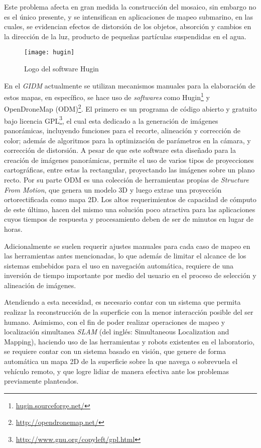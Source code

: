 Este problema afecta en gran medida la construcción del mosaico, sin embargo no es el único presente, y se intensifican en aplicaciones de mapeo submarino, en las cuales, se evidencian efectos de distorsión de los objetos, absorción y cambios en la dirección de la luz, producto de pequeñas partículas suspendidas en el agua.

\begin{wrapfigure}{r}{0.3\textwidth}
	\begin{center}
		\vspace*{-0.5in}
		\texttt{[image: hugin]}
	\end{center}
	\caption{Logo del software Hugin}
\end{wrapfigure}

En el \textit{GIDM} actualmente se utilizan mecanismos manuales para la elaboración de estos mapas, en específico, se hace uso de \textit{softwares} como Hugin\footnote{\url{hugin.sourceforge.net/}} y OpenDroneMap (ODM)\footnote{\url{http://opendronemap.net/}}. El primero es un programa de código abierto y gratuito bajo licencia GPL\footnote{\url{http://www.gnu.org/copyleft/gpl.html}}, el cual esta dedicado a la generación de imágenes panorámicas, incluyendo funciones para el recorte, alineación y corrección de color; además de algoritmos para la optimización de parámetros en la cámara, y corrección de distorsión. A pesar de que este software esta diseñado para la creación de imágenes panorámicas, permite el uso de varios tipos de proyecciones cartográficas, entre estas la rectangular, proyectando las imágenes sobre un plano recto. Por su parte ODM es una colección de herramientas propias de \textit{Structure From Motion}, que genera un modelo 3D y luego extrae una proyección ortorectificada como mapa 2D. Los altos requerimientos de capacidad de cómputo de este último, hacen del mismo una solución poco atractiva para las aplicaciones cuyos tiempos de respuesta y procesamiento deben de ser de minutos en lugar de horas.

Adicionalmente se suelen requerir ajustes manuales para cada caso de mapeo en las herramientas antes mencionadas, lo que además de limitar el alcance de los sistemas embebidos para el uso en navegación automática, requiere de una inversión de tiempo importante por medio del usuario en el proceso de selección y alineación de imágenes.

Atendiendo a esta necesidad, es necesario contar con un sistema que permita realizar la reconstrucción de la superficie con la menor interacción posible del ser humano. Asimismo, con el fin de poder realizar operaciones de mapeo y localización simultanea \textit{SLAM} (del inglés: Simultaneous Localization and Mapping), haciendo uso de las herramientas y robots existentes en el laboratorio, se requiere contar con un sistema basado en visión, que genere de forma automática un mapa 2D de la superficie sobre la que navega o sobrevuela el vehículo remoto, y que logre lidiar de manera efectiva ante los problemas previamente planteados.


